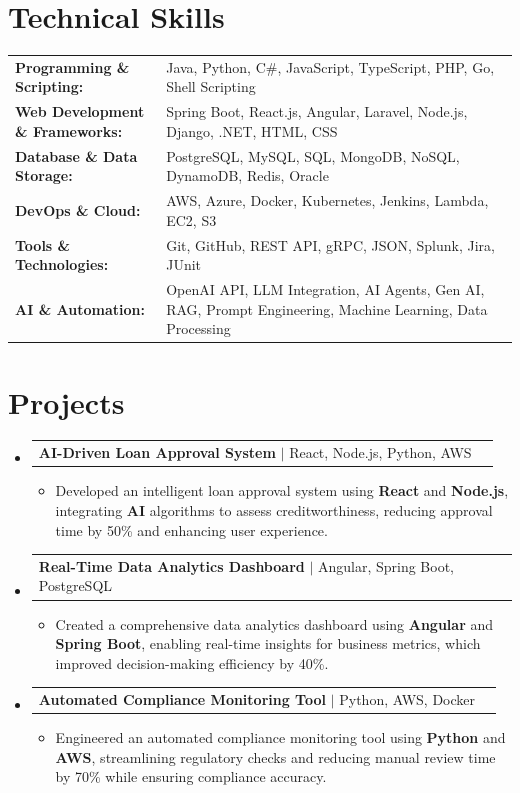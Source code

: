 \documentclass[letterpaper,10pt]{article}
\makeatletter
\newcommand{\resumeItem}[1]{
  \item{\fontsize{8pt}{9pt}\selectfont
    #1 \vspace{-3pt}
  }
}
\newcommand{\resumeProjectHeading}[2]{
    \item
    \begin{tabular*}{1.001\textwidth}{l@{\extracolsep{\fill}}r}
      \fontsize{8.5pt}{10pt}#1 & \textbf{\fontsize{8.5pt}{10pt} #2}\\
    \end{tabular*}\vspace{-7pt}
}
\newcommand{\resumeSubHeadingListStart}{\begin{itemize}[leftmargin=0pt, label={}]}
\newcommand{\resumeSubHeadingListEnd}{\end{itemize}}
\newcommand{\resumeItemListStart}{\begin{itemize}[leftmargin=*]}
\newcommand{\resumeItemListEnd}{\end{itemize}\vspace{-5pt}}
\makeatother
\begin{document}
\section{Technical Skills}
        \vspace{-14pt}
        \begin{table}[h]
            \fontsize{8pt}{9pt}\selectfont
            \begin{tabular}{p{0.3\linewidth} p{0.7\linewidth}}
                \textbf{Programming \& Scripting:} & Java, Python, C\#, JavaScript, TypeScript, PHP, Go, Shell Scripting \\
                \textbf{Web Development \& Frameworks:} & Spring Boot, React.js, Angular, Laravel, Node.js, Django, .NET, HTML, CSS \\
                \textbf{Database \& Data Storage:} & PostgreSQL, MySQL, SQL, MongoDB, NoSQL, DynamoDB, Redis, Oracle \\
                \textbf{DevOps \& Cloud:} & AWS, Azure, Docker, Kubernetes, Jenkins, Lambda, EC2, S3 \\
                \textbf{Tools \& Technologies:} & Git, GitHub, REST API, gRPC, JSON, Splunk, Jira, JUnit \\
                \textbf{AI \& Automation:} & OpenAI API, LLM Integration, AI Agents, Gen AI, RAG, Prompt Engineering, Machine Learning, Data Processing \\
            \end{tabular}
        \end{table}
 \vspace{-18pt}

\section{Projects}
    \vspace{-5pt}
    \resumeSubHeadingListStart
          \resumeProjectHeading
            {\textbf{AI-Driven Loan Approval System} $|$ React, Node.js, Python, AWS}{}
            \resumeItemListStart
                \resumeItem{Developed an intelligent loan approval system using \textbf{React} and \textbf{Node.js}, integrating \textbf{AI} algorithms to assess creditworthiness, reducing approval time by 50\% and enhancing user experience.}
            \resumeItemListEnd
        \vspace{-12pt}
    
        \resumeProjectHeading
            {\textbf{Real-Time Data Analytics Dashboard} $|$ Angular, Spring Boot, PostgreSQL}{}
        \resumeItemListStart
                \resumeItem{Created a comprehensive data analytics dashboard using \textbf{Angular} and \textbf{Spring Boot}, enabling real-time insights for business metrics, which improved decision-making efficiency by 40\%.}
        \resumeItemListEnd
      \vspace{-12pt}
      \resumeProjectHeading
        {\textbf{Automated Compliance Monitoring Tool} $|$ Python, AWS, Docker}{}
    \resumeItemListStart
            \resumeItem{Engineered an automated compliance monitoring tool using \textbf{Python} and \textbf{AWS}, streamlining regulatory checks and reducing manual review time by 70\% while ensuring compliance accuracy.}
    \resumeItemListEnd
    \resumeSubHeadingListEnd
\end{document}
